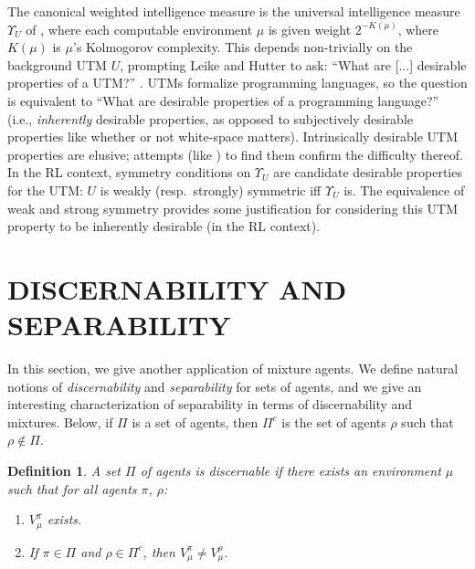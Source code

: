 \documentclass[twoside]{article}
\newtheorem{definition}[theorem]{Definition}
\begin{document}
The canonical weighted intelligence measure is the universal
intelligence measure $\Upsilon_U$ of \cite{legg2007universal},
where each computable environment
$\mu$ is given weight $2^{-K(\mu)}$, where $K(\mu)$ is $\mu$'s Kolmogorov complexity.
This depends non-trivially on the background UTM $U$,
prompting Leike and Hutter to ask: ``What are [...] desirable
properties of a UTM?'' \cite{leike2015bad}.
UTMs formalize programming languages, so the question is equivalent
to ``What are desirable properties of a programming language?'' (i.e., \emph{inherently}
desirable properties, as opposed to subjectively desirable properties like whether or
not white-space matters).
Intrinsically desirable UTM properties are elusive; attempts
(like \cite{muller2010stationary}) to find them confirm the difficulty thereof.
In the RL context, symmetry conditions on $\Upsilon_U$ are candidate desirable properties
for the UTM: $U$ is weakly (resp.\ strongly) symmetric iff $\Upsilon_U$ is.
The equivalence of weak and strong symmetry provides some justification for
considering this UTM property to be inherently desirable (in the RL context).


\section{DISCERNABILITY AND SEPARABILITY}

In this section, we give another application of mixture agents.
We define natural notions of \emph{discernability} and \emph{separability}
for sets of agents,
and we give an interesting characterization of separability
in terms of discernability and mixtures.
Below, if $\Pi$ is a set of agents, then
$\Pi^c$ is the set of agents $\rho$ such that $\rho\not\in\Pi$.

\begin{definition}
\label{discernabilitydefn}
    A set $\Pi$ of agents is \emph{discernable} if there exists
    an environment $\mu$ such that for all agents $\pi$, $\rho$:
    \begin{enumerate}
        \item $V^\pi_\mu$ exists.
        \item If $\pi\in\Pi$ and $\rho\in\Pi^c$, then $V^\pi_\mu\not=V^\rho_\mu$.
    \end{enumerate}
\end{definition}
\end{document}
